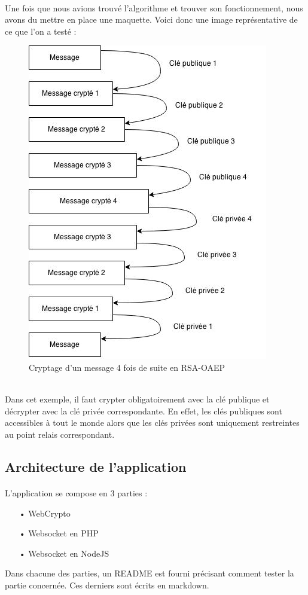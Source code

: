 \documentclass[a4paper,12pt]{report}
\begin{document}
	\paragraph*{}
	Une fois que nous avions trouvé l'algorithme et trouver son fonctionnement, nous avons du mettre en place une maquette. Voici donc une image représentative de ce que l'on a testé :
	\begin{figure}[h] %
		\includegraphics[scale=0.70]{RSA.jpg}
		\caption{Cryptage d'un message 4 fois de suite en RSA-OAEP}
		\label{RSA}
	\end{figure}
	\\
	Dans cet exemple, il faut crypter obligatoirement avec la clé publique et décrypter avec la clé privée correspondante. En effet, les clés publiques sont accessibles à tout le monde alors que les clés privées sont uniquement restreintes au point relais correspondant.

	\subsection{Architecture de l'application}
	\paragraph*{}
	L'application se compose en 3 parties :\\
	\begin{itemize}
		\item[•]WebCrypto
		\item[•]Websocket en PHP
		\item[•]Websocket en NodeJS
	\end{itemize}
	Dans chacune des parties, un README est fourni précisant comment tester la partie concernée. Ces derniers sont écrits en markdown.
\end{document}
